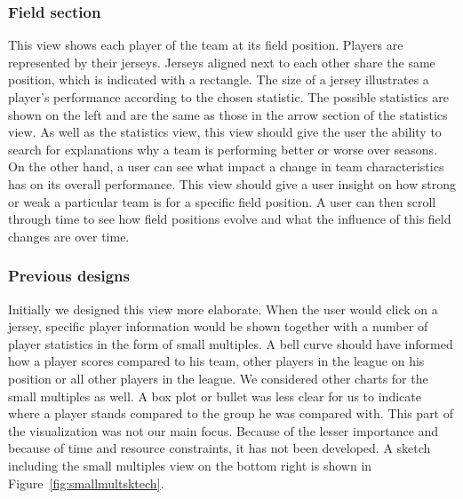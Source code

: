 \documentclass[]{sigchi}
\begin{document}
\subsubsection{Field section}
This view shows each player of the team at its field position. Players are
represented by their jerseys. Jerseys aligned next to each other share the same
position, which is indicated with a rectangle. The size of a jersey illustrates a
player's performance according to the chosen statistic. The possible statistics 
are shown on the left and are the same as those in the arrow section of the 
statistics view. As well as the statistics view, this view should give the user 
the ability to search for explanations why a team is performing better or worse 
over seasons. On the other hand, a user can see what impact a change in team 
characteristics has on its overall performance. This view should give a user 
insight on how strong or weak a particular team is for a specific field position. 
A user can then scroll through time to see how field positions evolve and what 
the influence of this field changes are over time.

\subsubsection{Previous designs}
Initially we designed this view more elaborate. When the user would click on a
jersey, specific player information would be shown together with a number of
player statistics in the form of small multiples. A bell curve should have
informed how a player scores compared to his team, other players in the league
on his position or all other players in the league. We considered other charts
for the small multiples as well. A box plot or bullet was less clear for us to
indicate where a player stands compared to the group he was compared with. This
part of the visualization was not our main focus. Because of the lesser
importance and because of time and resource constraints, it has not been
developed. A sketch including the small multiples view on the bottom right is
shown in Figure~\ref{fig:smallmultsktech}.
\end{document}
